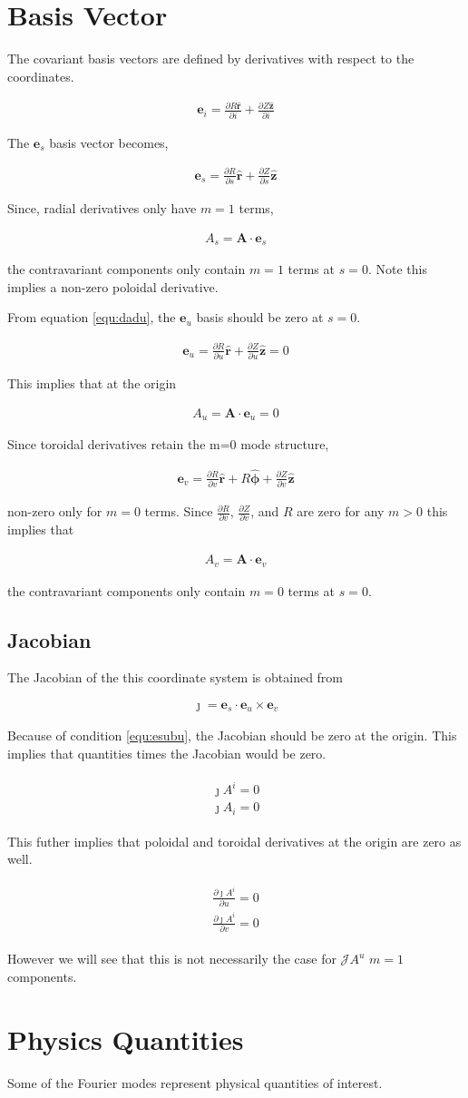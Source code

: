 \documentclass[11pt]{article}
\renewcommand{\vec}[1]{\boldsymbol#1}
\newcommand{\unitv}[1]{\hat{\vec{#1}}}
\newcommand{\co}[1]{\vec{e}_{#1}}
\newcommand{\pd}[2]{\frac{\partial#1}{\partial#2}}
\newcommand{\equ}[2]{
	\begin{equation}
    \begin{split}
	#1
	\label{#2}
	\end{split}
	\end{equation}
}
\newcommand{\dotp}[2]{#1\cdot#2}
\newcommand{\crossp}[2]{#1\times#2}
\begin{document}
\section{Basis Vector}
The covariant basis vectors are defined by derivatives with respect to the coordinates.
\equ{
\co{i}=\pd{R\unitv{r}}{i}+\pd{Z\unitv{z}}{i}
}{equ:basis}
The $\co{s}$ basis vector becomes,
\equ{
\co{s}=\pd{R}{s}\unitv{r}+\pd{Z}{s}\unitv{z}
}{equ:esubs}
Since, radial derivatives only have $m=1$ terms, 
\equ{
A_{s}=\dotp{\vec{A}}{\co{s}}
}{equ:asubs}
the contravariant components only contain $m=1$ terms at $s=0$.
Note this implies a non-zero poloidal derivative.

From equation \ref{equ:dadu}, the $\co{u}$ basis should be zero at $s=0$.
\equ{
\co{u}=\pd{R}{u}\unitv{r}+\pd{Z}{u}\unitv{z}=0
}{equ:esubu}
This implies that at the origin 
\equ{
A_{u}=\dotp{\vec{A}}{\co{u}}=0
}{equ:asubu}

Since toroidal derivatives retain the m=0 mode structure,
\equ{
\co{v}=\pd{R}{v}\unitv{r}+R\unitv{\phi}+\pd{Z}{v}\unitv{z}
}{equ:esubv}
non-zero only for $m=0$ terms.
Since $\pd{R}{v}$, $\pd{Z}{v}$, and $R$ are zero for any $m>0$ this implies that
\equ{
A_{v}=\dotp{\vec{A}}{\co{v}}
}{equ:asubv}
the contravariant components only contain $m=0$ terms at $s=0$.

\subsection{Jacobian}
The Jacobian of the this coordinate system is obtained from
\equ{
\jmath=\dotp{\co{s}}{\crossp{\co{u}}{\co{v}}}
}{equ:jacobian}
Because of condition \ref{equ:esubu}, the Jacobian should be zero at the origin.
This implies that quantities times the Jacobian would be zero.
\equ{
\begin{array}{l}
\jmath A^{i}=0 \\
\jmath A_{i}=0
\end{array}
}{equ:jacobian_vector}
This futher implies that poloidal and toroidal derivatives at the origin are zero as well.
\equ{
\begin{array}{l}
\pd{\jmath A^{i}}{u}=0 \\
\pd{\jmath A^{i}}{v}=0
\end{array}
}{equ:jacobian_dervative}
However we will see that this is not necessarily the case for $\mathcal{J}A^{u}$ $m=1$ components.

\section{Physics Quantities}
Some of the Fourier modes represent physical quantities of interest.
\end{document}
